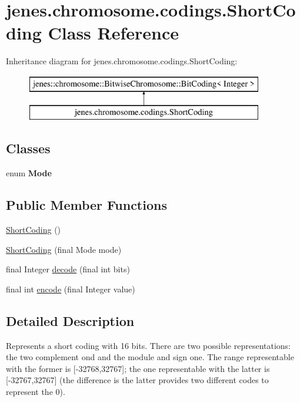 \hypertarget{classjenes_1_1chromosome_1_1codings_1_1_short_coding}{\section{jenes.\-chromosome.\-codings.\-Short\-Coding Class Reference}
\label{classjenes_1_1chromosome_1_1codings_1_1_short_coding}
}
Inheritance diagram for jenes.\-chromosome.\-codings.\-Short\-Coding\-:\begin{figure}[H]
\begin{center}
\leavevmode
\includegraphics[height=2.000000cm]{classjenes_1_1chromosome_1_1codings_1_1_short_coding}
\end{center}
\end{figure}
\subsection*{Classes}
\begin{DoxyCompactItemize}
\item 
enum {\bfseries Mode}
\end{DoxyCompactItemize}
\subsection*{Public Member Functions}
\begin{DoxyCompactItemize}
\item 
\hyperlink{classjenes_1_1chromosome_1_1codings_1_1_short_coding_a0571cd23357dd77c1525ed09a5c28e61}{Short\-Coding} ()
\item 
\hyperlink{classjenes_1_1chromosome_1_1codings_1_1_short_coding_a6b6608f22e850e062f424033fae5e0bd}{Short\-Coding} (final Mode mode)
\item 
final Integer \hyperlink{classjenes_1_1chromosome_1_1codings_1_1_short_coding_aa6c8649fe7e82bf923979d4afdfc9130}{decode} (final int bits)
\item 
final int \hyperlink{classjenes_1_1chromosome_1_1codings_1_1_short_coding_a140298d12b6d6a291b5849b9cc5b7400}{encode} (final Integer value)
\end{DoxyCompactItemize}


\subsection{Detailed Description}
Represents a short coding with 16 bits. There are two possible representations\-: the two complement ond and the module and sign one. The range representable with the former is \mbox{[}-\/32768,32767\mbox{]}; the one representable with the latter is \mbox{[}-\/32767,32767\mbox{]} (the difference is the latter provides two different codes to represent the 0).

